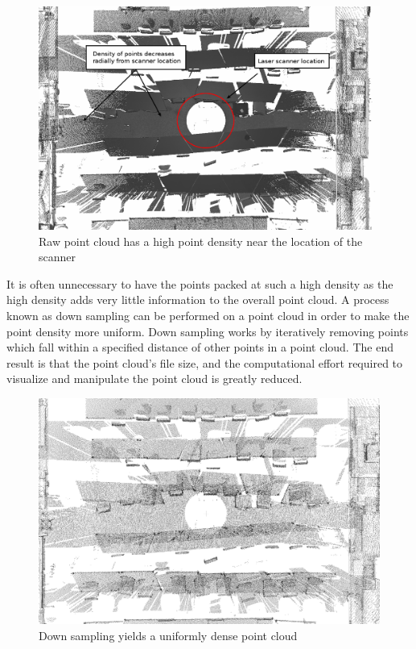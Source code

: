\documentclass[11pt,a4paper]{report}
\begin{document}
						\begin{figure}[H]
							\centering
							\includegraphics[width=1\textwidth]{dense_point_cloud}
							\caption{Raw point cloud has a high point density near the location of the scanner}
							\label{fig:dense_point_cloud}
						\end{figure}
						
						It is often unnecessary to have the points packed at such a high density as the high density adds very little information to the overall point cloud. A process known as down sampling can be performed on a point cloud in order to make the point density more uniform. Down sampling works by iteratively removing points which fall within a specified distance of other points in a point cloud. The end result is that the point cloud's file size, and the computational effort required to visualize and manipulate the point cloud is greatly reduced.
						\cite{_selection_????}
						
						\begin{figure}[H]
							\centering
							\includegraphics[width=1\textwidth]{uniform_point_cloud}
							\caption{Down sampling yields a uniformly dense point cloud}
							\label{fig:uniform_point_cloud}
						\end{figure}
						
\end{document}
